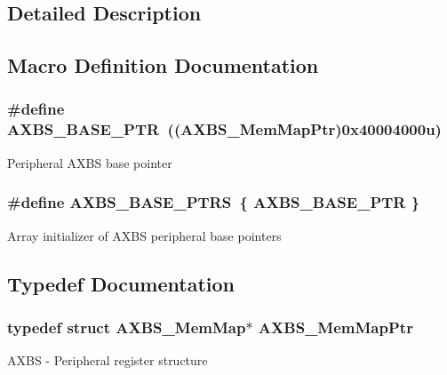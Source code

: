 \subsection{Detailed Description}


\subsection{Macro Definition Documentation}
\hypertarget{group___a_x_b_s___peripheral_gacbbf56489b86d1ddb3e0ac291922a56d}{}
\subsubsection[{A\+X\+B\+S\+\_\+\+B\+A\+S\+E\+\_\+\+P\+T\+R}]{\setlength{\rightskip}{0pt plus 5cm}\#define A\+X\+B\+S\+\_\+\+B\+A\+S\+E\+\_\+\+P\+T\+R~(({\bf A\+X\+B\+S\+\_\+\+Mem\+Map\+Ptr})0x40004000u)}\label{group___a_x_b_s___peripheral_gacbbf56489b86d1ddb3e0ac291922a56d}
Peripheral A\+X\+B\+S base pointer \hypertarget{group___a_x_b_s___peripheral_ga522ab97d5ed3e73f1cb3591c40ecc50e}{}
\subsubsection[{A\+X\+B\+S\+\_\+\+B\+A\+S\+E\+\_\+\+P\+T\+R\+S}]{\setlength{\rightskip}{0pt plus 5cm}\#define A\+X\+B\+S\+\_\+\+B\+A\+S\+E\+\_\+\+P\+T\+R\+S~\{ {\bf A\+X\+B\+S\+\_\+\+B\+A\+S\+E\+\_\+\+P\+T\+R} \}}\label{group___a_x_b_s___peripheral_ga522ab97d5ed3e73f1cb3591c40ecc50e}
Array initializer of A\+X\+B\+S peripheral base pointers 

\subsection{Typedef Documentation}
\hypertarget{group___a_x_b_s___peripheral_ga8f768bd75d5c94d51b05e9ef4a38ea33}{}
\subsubsection[{A\+X\+B\+S\+\_\+\+Mem\+Map\+Ptr}]{\setlength{\rightskip}{0pt plus 5cm}typedef struct {\bf A\+X\+B\+S\+\_\+\+Mem\+Map}$\ast$ {\bf A\+X\+B\+S\+\_\+\+Mem\+Map\+Ptr}}\label{group___a_x_b_s___peripheral_ga8f768bd75d5c94d51b05e9ef4a38ea33}
A\+X\+B\+S -\/ Peripheral register structure 